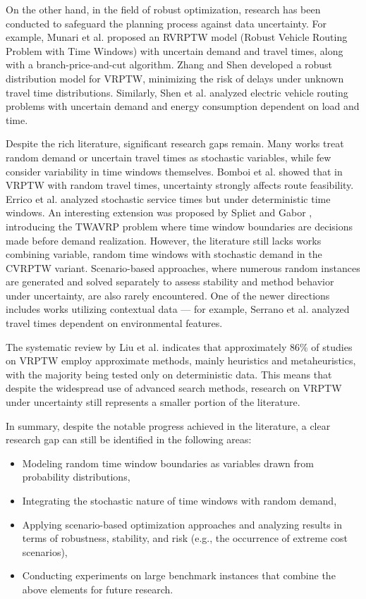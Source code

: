 On the other hand, in the field of robust optimization, research has been conducted to safeguard the planning process against data uncertainty. For example, Munari et al. \cite{Munari2018} proposed an RVRPTW model (Robust Vehicle Routing Problem with Time Windows) with uncertain demand and travel times, along with a branch-price-and-cut algorithm. Zhang and Shen \cite{Zhang2021} developed a robust distribution model for VRPTW, minimizing the risk of delays under unknown travel time distributions. Similarly, Shen et al. \cite{Shen2022} analyzed electric vehicle routing problems with uncertain demand and energy consumption dependent on load and time.

Despite the rich literature, significant research gaps remain. Many works treat random demand or uncertain travel times as stochastic variables, while few consider variability in time windows themselves. Bomboi et al. \cite{Bomboi2022} showed that in VRPTW with random travel times, uncertainty strongly affects route feasibility. Errico et al. \cite{Errico2016} analyzed stochastic service times but under deterministic time windows. An interesting extension was proposed by Spliet and Gabor \cite{Spliet2014}, introducing the TWAVRP problem where time window boundaries are decisions made before demand realization. However, the literature still lacks works combining variable, random time windows with stochastic demand in the CVRPTW variant. Scenario-based approaches, where numerous random instances are generated and solved separately to assess stability and method behavior under uncertainty, are also rarely encountered. One of the newer directions includes works utilizing contextual data — for example, Serrano et al. \cite{Serano2024} analyzed travel times dependent on environmental features.

The systematic review by Liu et al. \cite{Liu2023} indicates that approximately 86\% of studies on VRPTW employ approximate methods, mainly heuristics and metaheuristics, with the majority being tested only on deterministic data. This means that despite the widespread use of advanced search methods, research on VRPTW under uncertainty still represents a smaller portion of the literature.

In summary, despite the notable progress achieved in the literature, a clear research gap can still be identified in the following areas:
\begin{itemize}
    \item Modeling random time window boundaries as variables drawn from probability distributions,
    \item Integrating the stochastic nature of time windows with random demand,
    \item Applying scenario-based optimization approaches and analyzing results in terms of robustness, stability, and risk (e.g., the occurrence of extreme cost scenarios),
    \item Conducting experiments on large benchmark instances that combine the above elements for future research.
\end{itemize}


